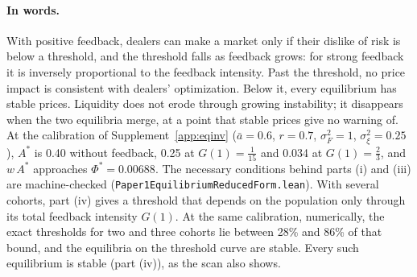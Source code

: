 \documentclass[12pt]{article}
\theoremstyle{definition}
\theoremstyle{remark}
\begin{document}
\paragraph{In words.} With positive feedback, dealers can make a market only if their dislike of risk is below a threshold, and the threshold falls as feedback grows: for strong feedback it is inversely proportional to the feedback intensity. Past the threshold, no price impact is consistent with dealers' optimization. Below it, every equilibrium has stable prices. Liquidity does not erode through growing instability; it disappears when the two equilibria merge, at a point that stable prices give no warning of. At the calibration of Supplement~\ref{app:eqinv} ($\bar a=0.6$, $r=0.7$, $\sigma_F^2=1$, $\sigma_\xi^2=0.25$), $A^*$ is 0.40 without feedback, 0.25 at $G(1)=\tfrac1{15}$ and 0.034 at $G(1)=\tfrac23$, and $w\,A^*$ approaches $\Phi^*=0.00688$. The necessary conditions behind parts (i) and (iii) are machine-checked (\nolinkurl{Paper1EquilibriumReducedForm.lean}). With several cohorts, part (iv) gives a threshold that depends on the population only through its total feedback intensity $G(1)$. At the same calibration, numerically, the exact thresholds for two and three cohorts lie between 28\% and 86\% of that bound, and the equilibria on the threshold curve are stable. Every such equilibrium is stable (part (iv)), as the scan also shows.
\end{document}

